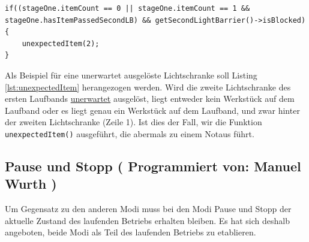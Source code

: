 \documentclass[fontsize=11pt,a4paper,final]{scrartcl}[2003/01/01]
\newcommand*{\manu}{%
	Programmiert von: Manuel Wurth
}
\begin{document}
\begin{lstlisting}[caption={Beispiel: Zweite Lichtschranke wird unerwartet ausgelöst},label={lst:unexpectedItem}]
if((stageOne.itemCount == 0 || stageOne.itemCount == 1 && stageOne.hasItemPassedSecondLB) && getSecondLightBarrier()->isBlocked)
{
	unexpectedItem(2);
}
\end{lstlisting}
Als Beispiel für eine unerwartet ausgelöste Lichtschranke soll Listing \ref{lst:unexpectedItem} herangezogen werden. Wird die zweite Lichtschranke des ersten Laufbands \underline{unerwartet} ausgelöst, liegt entweder kein Werkstück auf dem Laufband oder es liegt genau ein Werkstück auf dem Laufband, und zwar hinter der zweiten Lichtschranke (Zeile 1). Ist dies der Fall, wir die Funktion \lstinline|unexpectedItem()| ausgeführt, die abermals zu einem Notaus führt.

\subsection{Pause und Stopp (\manu)}
Um Gegensatz zu den anderen Modi muss bei den Modi Pause und Stopp der aktuelle Zustand des laufenden Betriebs erhalten bleiben. Es hat sich deshalb angeboten, beide Modi als Teil des laufenden Betriebs zu etablieren.
\end{document}
